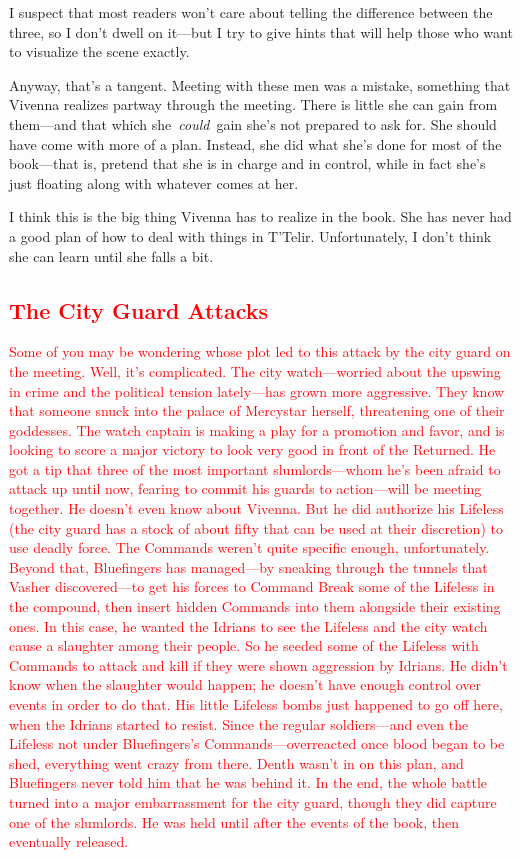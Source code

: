 I suspect that most readers won’t care about telling the difference between the three, so I don’t dwell on it—but I try to give hints that will help those who want to visualize the scene exactly.

Anyway, that’s a tangent. Meeting with these men was a mistake, something that Vivenna realizes partway through the meeting. There is little she can gain from them—and that which she~\textit{could}~gain she’s not prepared to ask for. She should have come with more of a plan. Instead, she did what she’s done for most of the book—that is, pretend that she is in charge and in control, while in fact she’s just floating along with whatever comes at her.

I think this is the big thing Vivenna has to realize in the book. She has never had a good plan of how to deal with things in T’Telir. Unfortunately, I don’t think she can learn until she falls a bit.

\textcolor{red}{
\subsection*{The City Guard Attacks}
}
\textcolor{red}{
Some of you may be wondering whose plot led to this attack by the city guard on the meeting.
}
\textcolor{red}{
Well, it’s complicated. The city watch—worried about the upswing in crime and the political tension lately—has grown more aggressive. They know that someone snuck into the palace of Mercystar herself, threatening one of their goddesses. The watch captain is making a play for a promotion and favor, and is looking to score a major victory to look very good in front of the Returned. He got a tip that three of the most important slumlords—whom he’s been afraid to attack up until now, fearing to commit his guards to action—will be meeting together. He doesn’t even know about Vivenna.
}
\textcolor{red}{
But he did authorize his Lifeless (the city guard has a stock of about fifty that can be used at their discretion) to use deadly force. The Commands weren’t quite specific enough, unfortunately.
}
\textcolor{red}{
Beyond that, Bluefingers has managed—by sneaking through the tunnels that Vasher discovered—to get his forces to Command Break some of the Lifeless in the compound, then insert hidden Commands into them alongside their existing ones. In this case, he wanted the Idrians to see the Lifeless and the city watch cause a slaughter among their people. So he seeded some of the Lifeless with Commands to attack and kill if they were shown aggression by Idrians.
}
\textcolor{red}{
He didn’t know when the slaughter would happen; he doesn’t have enough control over events in order to do that. His little Lifeless bombs just happened to go off here, when the Idrians started to resist. Since the regular soldiers—and even the Lifeless not under Bluefingers’s Commands—overreacted once blood began to be shed, everything went crazy from there.
}
\textcolor{red}{
Denth wasn’t in on this plan, and Bluefingers never told him that he was behind it. In the end, the whole battle turned into a major embarrassment for the city guard, though they did capture one of the slumlords. He was held until after the events of the book, then eventually released.
}


